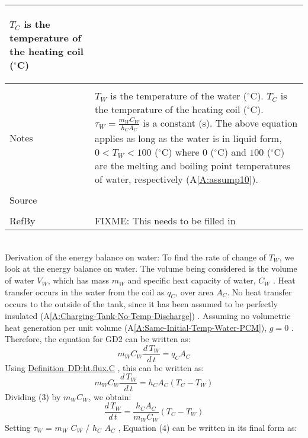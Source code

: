 \documentclass[12pt]{article}
\begin{document}
\begin{minipage}{\textwidth}
\begin{tabular}{p{} p{}}
\begin{symbDescription}
              \item{${T_{C}}$ is the temperature of the heating coil (${}^{\circ}$C)}
              \end{symbDescription}
\\ \midrule \\
Notes & ${T_{W}}$ is the temperature of the water (${}^{\circ}$C). ${T_{C}}$ is the temperature of the heating coil (${}^{\circ}$C). ${τ_{W}}=\frac{{m_{W}} {C_{W}}}{{h_{C}} {A_{C}}}$ is a constant (s). The above equation applies as long as the water is in liquid form, $0<{T_{W}}<100$ (${}^{\circ}$C) where $0$ (${}^{\circ}$C) and $100$ (${}^{\circ}$C) are the melting and boiling point temperatures of water, respectively (A\ref{A:assump10}).
\\ \midrule \\
Source & 
\\ \midrule \\
RefBy & FIXME: This needs to be filled in
\\ \bottomrule \end{tabular}
\end{minipage}\\
Derivation of the energy balance on water:
To find the rate of change of ${T_{W}}$, we look at the energy balance on water. The volume being considered is the volume of water ${V_{W}}$, which has mass ${m_{W}}$ and specific heat capacity of water, ${C_{W}}$ . Heat transfer occurs in the water from the coil as ${q_{C}}$, over area ${A_{C}}$. No heat transfer occurs to the outside of the tank, since it has been assumed to be perfectly insulated (A\ref{A:Charging-Tank-No-Temp-Discharge}) . Assuming no volumetric heat generation per unit volume (A\ref{A:Same-Initial-Temp-Water-PCM}), $g=0$ . Therefore, the equation for GD2 can be written as:
\begin{dmath}
{m_{W}} {C_{W}} \frac{d\,{T_{W}}}{d\,t}={q_{C}} {A_{C}}
\end{dmath}
Using \hyperref[DD:ht.flux.C]{Definition~DD:ht.flux.C} , this can be written as:
\begin{dmath}
{m_{W}} {C_{W}} \frac{d\,{T_{W}}}{d\,t}={h_{C}} {A_{C}} \left({T_{C}}-{T_{W}}\right)
\end{dmath}
Dividing (3) by ${m_{W}} {C_{W}}$, we obtain:
\begin{dmath}
\frac{d\,{T_{W}}}{d\,t}=\frac{{h_{C}} {A_{C}}}{{m_{W}} {C_{W}}} \left({T_{C}}-{T_{W}}\right)
\end{dmath}
Setting ${τ_{W}}$ = ${m_{W}}$ ${C_{W}}$ / ${h_{C}}$ ${A_{C}}$ , Equation (4) can be written in its final form as:
\end{document}
